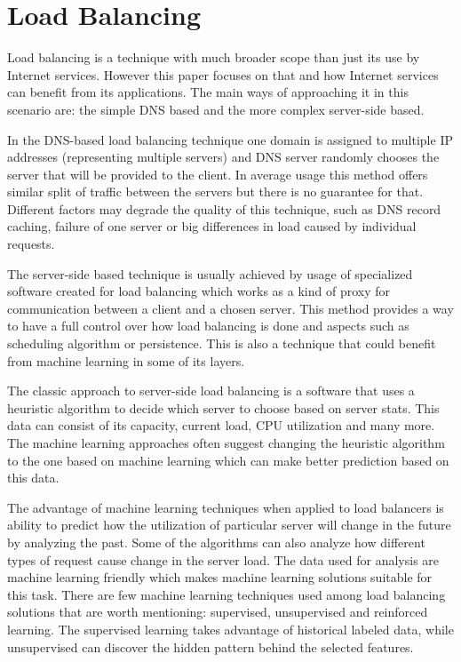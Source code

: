 \documentclass[conference]{IEEEtran}
\begin{document}
\section{Load Balancing}
Load balancing is a technique with much broader scope than just its use by Internet services. However this paper focuses on that and how Internet services can benefit from its applications. The main ways of approaching it in this scenario are: the simple DNS based and the more complex server-side based.\par
In the DNS-based load balancing technique one domain is assigned to multiple IP addresses (representing multiple servers) and DNS server randomly chooses the server that will be provided to the client. In average usage this method offers similar split of traffic between the servers but there is no guarantee for that. Different factors may degrade the quality of this technique, such as DNS record caching, failure of one server or big differences in load caused by individual requests\cite{balancing-rfc}.\par
The server-side based technique is usually achieved by usage of specialized software created for load balancing which works as a kind of proxy for communication between a client and a chosen server. This method provides a way to have a full control over how load balancing is done and aspects such as scheduling algorithm or persistence. This is also a technique that could benefit from machine learning in some of its layers\cite{balancing2}\cite{balancing3}.\par
The classic approach to server-side load balancing is a software that uses a heuristic algorithm to decide which server to choose based on server stats. This data can consist of its capacity, current load, CPU utilization and many more\cite{balancing1}. The machine learning approaches often suggest changing the heuristic algorithm to the one based on machine learning which can make better prediction based on this data\cite{balancing3}.\par
The advantage of machine learning techniques when applied to load balancers is ability to predict how the utilization of particular server will change in the future by analyzing the past. Some of the algorithms can also analyze how different types of request cause change in the server load. The data used for analysis are machine learning friendly which makes machine learning solutions suitable for this task\cite{balancing3}.
There are few machine learning techniques used among load balancing solutions that are worth mentioning: supervised\cite{balancing3}\cite{balancing5}, unsupervised\cite{balancing5}\cite{balancing4} and reinforced\cite{balancing6} learning. The supervised learning takes advantage of historical labeled data, while unsupervised can discover the hidden pattern behind the selected features.\par
\end{document}
